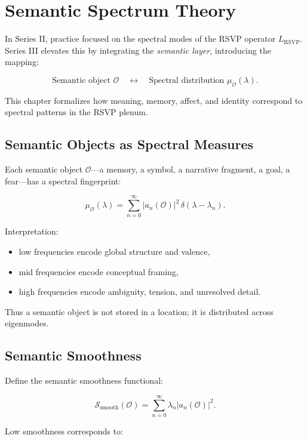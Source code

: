 \documentclass[12pt]{article}
\begin{document}
\chapter{Semantic Spectrum Theory}

In Series II, practice focused on the spectral modes of the RSVP operator
$L_{\text{RSVP}}$.  
Series III elevates this by integrating the \emph{semantic layer}, introducing the
mapping:

\[
\text{Semantic object } \mathcal{O}
\quad \longleftrightarrow \quad
\text{Spectral distribution } \mu_{\mathcal{O}}(\lambda).
\]

This chapter formalizes how meaning, memory, affect, and identity correspond to
spectral patterns in the RSVP plenum.

\section{Semantic Objects as Spectral Measures}

Each semantic object $\mathcal{O}$---a memory, a symbol, a narrative fragment, a
goal, a fear---has a spectral fingerprint:

\[
\mu_{\mathcal{O}}(\lambda)
    = \sum_{n=0}^{\infty} |a_n(\mathcal{O})|^2\,\delta(\lambda - \lambda_n).
\]

Interpretation:

\begin{itemize}
\item low frequencies encode global structure and valence,
\item mid frequencies encode conceptual framing,
\item high frequencies encode ambiguity, tension, and unresolved detail.
\end{itemize}

Thus a semantic object is not stored in a location;  
it is distributed across eigenmodes.

\section{Semantic Smoothness}

Define the semantic smoothness functional:

\[
\mathcal{S}_{\mathrm{smooth}}(\mathcal{O})
    = \sum_{n=0}^\infty \lambda_n |a_n(\mathcal{O})|^2.
\]

Low smoothness corresponds to:
\end{document}
